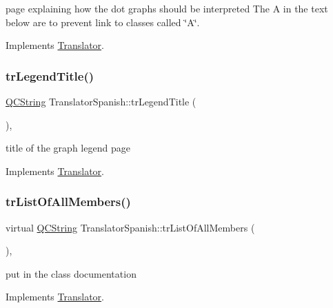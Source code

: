 page explaining how the dot graph\textquotesingle{}s should be interpreted The A in the text below are to prevent link to classes called \char`\"{}\+A\char`\"{}. 

Implements \mbox{\hyperlink{class_translator}{Translator}}.

\mbox{\label{class_translator_spanish_ae36cf2fbe0f335d87fa57d37d8a45e67}} 
\subsubsection{\texorpdfstring{trLegendTitle()}{trLegendTitle()}}
{\footnotesize\ttfamily \mbox{\hyperlink{class_q_c_string}{Q\+C\+String}} Translator\+Spanish\+::tr\+Legend\+Title (\begin{DoxyParamCaption}{ }\end{DoxyParamCaption})\hspace{0.3cm}{\ttfamily [inline]}, {\ttfamily [virtual]}}

title of the graph legend page 

Implements \mbox{\hyperlink{class_translator}{Translator}}.

\mbox{\label{class_translator_spanish_a942f3e3a9a27ceeafc0e44f4fe474466}} 
\subsubsection{\texorpdfstring{trListOfAllMembers()}{trListOfAllMembers()}}
{\footnotesize\ttfamily virtual \mbox{\hyperlink{class_q_c_string}{Q\+C\+String}} Translator\+Spanish\+::tr\+List\+Of\+All\+Members (\begin{DoxyParamCaption}{ }\end{DoxyParamCaption})\hspace{0.3cm}{\ttfamily [inline]}, {\ttfamily [virtual]}}

put in the class documentation 

Implements \mbox{\hyperlink{class_translator}{Translator}}.

\mbox{\label{class_translator_spanish_a2a82015b4a363a6feb36cd548ba4aadf}} 
